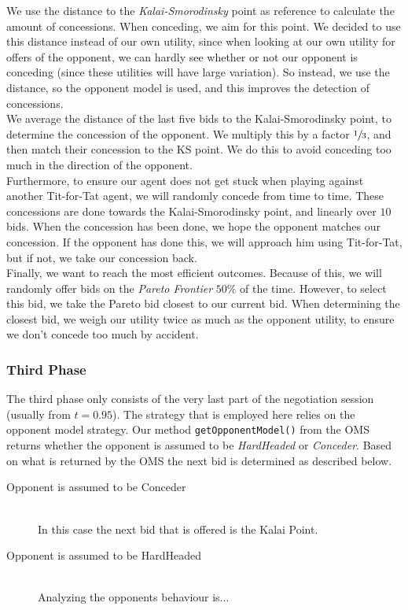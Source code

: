 We use the distance to the \emph{Kalai-Smorodinsky} point as reference to calculate
the amount of concessions. When conceding, we aim for this point.
We decided to use this distance instead of our own utility, since when looking
at our own utility for offers of the opponent, we can hardly see whether or not
our opponent is conceding (since these utilities will have large variation).
So instead, we use the distance, so the opponent model is used, and 
this improves the detection of concessions. \\

We average the distance of the last five bids to the Kalai-Smorodinsky point,
to determine the concession of the opponent. We
multiply this by a factor $\sfrac{1}{3}$, and then match their concession to the KS point.
We do this to avoid conceding too much in the direction of the opponent. \\

Furthermore, to ensure our agent does not get stuck when playing against 
another Tit-for-Tat agent, we will randomly concede from time to time. 
These concessions are done towards the Kalai-Smorodinsky point, and linearly over 
$10$ bids. When the concession has been done, we hope the opponent matches 
our concession. If the opponent has done this, we will approach him
using Tit-for-Tat, but if not, we take our concession back. \\

Finally, we want to reach the most efficient outcomes. Because of this,
we will randomly offer bids on the \emph{Pareto Frontier} $50\%$ of the time.
However, to select this bid, we take the Pareto bid closest to our current bid.
When determining the closest bid, we weigh our utility twice as much
as the opponent utility, to ensure we don't concede too much by accident.

\subsubsection{Third Phase}

The third phase only consists of the very last part of the negotiation session (usually from $t=0.95$). The strategy that is employed here relies on the opponent model strategy. Our method \texttt{getOpponentModel()} from the OMS returns whether the opponent is assumed to be \emph{HardHeaded} or \emph{Conceder}. Based on what is returned by the OMS the next bid is determined as described below.

\begin{description}
  \item[Opponent is assumed to be Conceder] \hfill \\
  In this case the next bid that is offered is the Kalai Point.

  \item[Opponent is assumed to be HardHeaded] \hfill \\
  Analyzing the opponents behaviour is...
\end{description}

